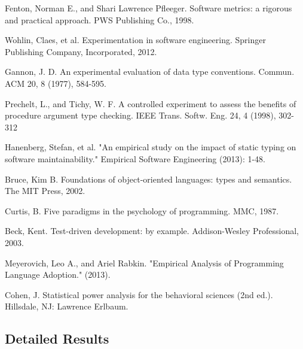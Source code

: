 \documentclass[msc]{ppgccufmg}
\begin{document}
\begin{thebibliography}{}
Fenton, Norman E., and Shari Lawrence Pfleeger. Software metrics: a rigorous and practical approach. PWS Publishing Co., 1998.

Wohlin, Claes, et al. Experimentation in software engineering. Springer Publishing Company, Incorporated, 2012.

Gannon, J. D. An experimental evaluation of data type conventions. Commun. ACM 20, 8 (1977), 584-595.

Prechelt, L., and Tichy, W. F. A controlled experiment to assess the benefits of procedure argument type checking. IEEE Trans. Softw. Eng. 24, 4 (1998), 302-312

Hanenberg, Stefan, et al. "An empirical study on the impact of static typing on software maintainability." Empirical Software Engineering (2013): 1-48.

Bruce, Kim B. Foundations of object-oriented languages: types and semantics. The MIT Press, 2002.

Curtis, B. Five paradigms in the psychology of programming. MMC, 1987.

Beck, Kent. Test-driven development: by example. Addison-Wesley Professional, 2003.

Meyerovich, Leo A., and Ariel Rabkin. "Empirical Analysis of Programming Language Adoption." (2013).

Cohen, J. Statistical power analysis for the behavioral sciences (2nd ed.). Hillsdale, NJ: Lawrence Erlbaum.

\end{thebibliography}


\begin{appendices}



\end{appendices}


\begin{attachments}


\chapter{Detailed Results\label{detailed_results}}


\end{attachments}
\end{document}
